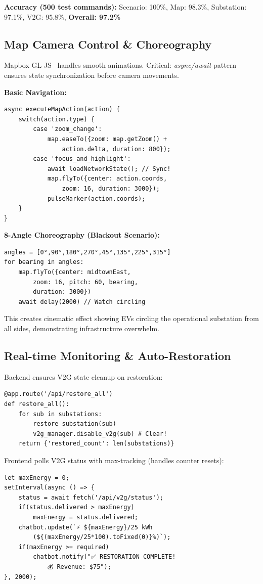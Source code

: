 \documentclass[sigconf]{acmart}
\begin{document}
\textbf{Accuracy (500 test commands):} Scenario: 100\%, Map: 98.3\%, Substation: 97.1\%, V2G: 95.8\%, \textbf{Overall: 97.2\%}

\subsection{Map Camera Control \& Choreography}

Mapbox GL JS~\cite{roth2017cartographic} handles smooth animations. Critical: \textit{async/await} pattern ensures state synchronization before camera movements.

\textbf{Basic Navigation:}
\begin{verbatim}
async executeMapAction(action) {
    switch(action.type) {
        case 'zoom_change':
            map.easeTo({zoom: map.getZoom() +
                action.delta, duration: 800});
        case 'focus_and_highlight':
            await loadNetworkState(); // Sync!
            map.flyTo({center: action.coords,
                zoom: 16, duration: 3000});
            pulseMarker(action.coords);
    }
}
\end{verbatim}

\textbf{8-Angle Choreography (Blackout Scenario):}
\begin{verbatim}
angles = [0°,90°,180°,270°,45°,135°,225°,315°]
for bearing in angles:
    map.flyTo({center: midtownEast,
        zoom: 16, pitch: 60, bearing,
        duration: 3000})
    await delay(2000) // Watch circling
\end{verbatim}

This creates cinematic effect showing EVs circling the operational substation from all sides, demonstrating infrastructure overwhelm.

\subsection{Real-time Monitoring \& Auto-Restoration}

Backend ensures V2G state cleanup on restoration:
\begin{verbatim}
@app.route('/api/restore_all')
def restore_all():
    for sub in substations:
        restore_substation(sub)
        v2g_manager.disable_v2g(sub) # Clear!
    return {'restored_count': len(substations)}
\end{verbatim}

Frontend polls V2G status with max-tracking (handles counter resets):
\begin{verbatim}
let maxEnergy = 0;
setInterval(async () => {
    status = await fetch('/api/v2g/status');
    if(status.delivered > maxEnergy)
        maxEnergy = status.delivered;
    chatbot.update(`⚡ ${maxEnergy}/25 kWh
        (${(maxEnergy/25*100).toFixed(0)}%)`);
    if(maxEnergy >= required)
        chatbot.notify("✅ RESTORATION COMPLETE!
            💰 Revenue: $75");
}, 2000);
\end{verbatim}
\end{document}
